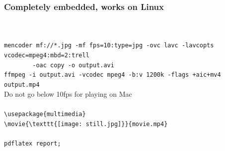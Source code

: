 \documentclass{beamer}
\title{\FileTitle}
\author{\FileAuthor}
\date{\today}
\begin{document}
\presentation



 
\begin{frame}[fragile]
  \frametitle{Completely embedded, works on Linux}
  \\[0.3cm]
  \\[0.1cm]
  {\tiny
    \hspace*{1cm}\verb|mencoder mf://*.jpg -mf fps=10:type=jpg -ovc lavc -lavcopts vcodec=mpeg4:mbd=2:trell|\\
    \hspace*{1cm}\verb|        -oac copy -o output.avi|\\[0.1cm]
    \hspace*{1cm}\verb|ffmpeg -i output.avi -vcodec mpeg4 -b:v 1200k -flags +aic+mv4 output.mp4|\\[0.1cm]
    \hspace*{1cm}Do not go below 10fps for playing on Mac\\[0.3cm]
  }
  \\[0.1cm]
  {\tiny
    \hspace*{1cm}\verb|\usepackage{multimedia}|\\[0.1cm]
    \hspace*{1cm}\verb|\movie{\texttt{[image: still.jpg]}}{movie.mp4}|\\[0.3cm]
  }
  \\[0.1cm]
  {\tiny
    \hspace*{1cm}\verb|pdflatex report;|\\[0.3cm]
  }
\end{frame}
\end{document}
